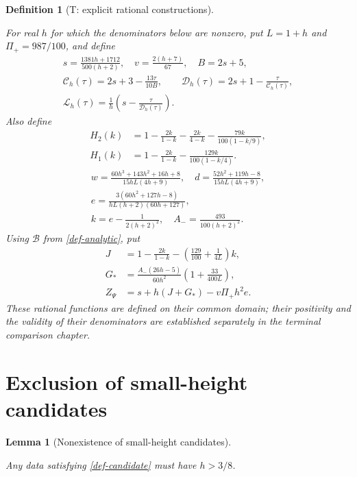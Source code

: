 \documentclass[11pt,a4paper]{article}
\theoremstyle{proofmanuscript}
\newtheorem{lemma}[theorem]{Lemma}
\newtheorem{definition}[theorem]{Definition}
\begin{document}
\begin{definition}[T: explicit rational constructions]\label{def-terminal-rationals}

For real \(h\) for which the denominators below are nonzero, put \(L=1+h\) and \(\Pi_+=987/100\), and define \[
\begin{gathered}
s=\frac{1381h+1712}{500(h+2)},\quad v=\frac{2(h+7)}{67},\quad B=2s+5,\\
\mathcal C_h(\tau)=2s+3-\frac{13\tau}{10B},\qquad
\mathcal D_h(\tau)=2s+1-\frac{\tau}{\mathcal C_h(\tau)},\\
\mathcal L_h(\tau)=\frac1h\left(s-\frac{\tau}{\mathcal D_h(\tau)}\right).
\end{gathered}
\] Also define \[
\begin{aligned}
H_2(k)&=1-\frac{2k}{1-k}-\frac{2k}{4-k}-\frac{79k}{100(1-k/9)},\\
H_1(k)&=1-\frac{2k}{1-k}-\frac{129k}{100(1-k/4)}.
\end{aligned}
\] \[
\begin{gathered}
w=\frac{60h^3+143h^2+16h+8}{15hL(4h+9)},\quad
 d=\frac{52h^2+119h-8}{15hL(4h+9)},\\
 e=\frac{3(60h^2+127h-8)}{hL(h+2)(60h+127)},\\
 k=e-\frac1{2(h+2)^2},\quad A_- =\frac{493}{100(h+2)^2}.
\end{gathered}
\] Using \(\mathcal B\) from \ref{def-analytic}, put \[
\begin{aligned}
J&=1-\frac{2k}{1-k}-\left(\frac{129}{100}+\frac1{4L}\right)k,\\
G_* &=\frac{A_-(26h-5)}{60h^2}\left(1+\frac{33}{400L}\right),\\
Z_\Psi&=s+h(J+G_*)-v\Pi_+h^2e.
\end{aligned}
\] These rational functions are defined on their common domain; their positivity and the validity of their denominators are established separately in the terminal comparison chapter.

\end{definition}


\section{Exclusion of small-height candidates}

\begin{lemma}[Nonexistence of small-height candidates]\label{lem-small}

Any data satisfying \ref{def-candidate} must have \(h>3/8\).

\end{lemma}
\end{document}
